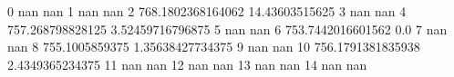 0 nan nan
1 nan nan
2 768.1802368164062 14.43603515625
3 nan nan
4 757.268798828125 3.52459716796875
5 nan nan
6 753.7442016601562 0.0
7 nan nan
8 755.1005859375 1.35638427734375
9 nan nan
10 756.1791381835938 2.4349365234375
11 nan nan
12 nan nan
13 nan nan
14 nan nan
